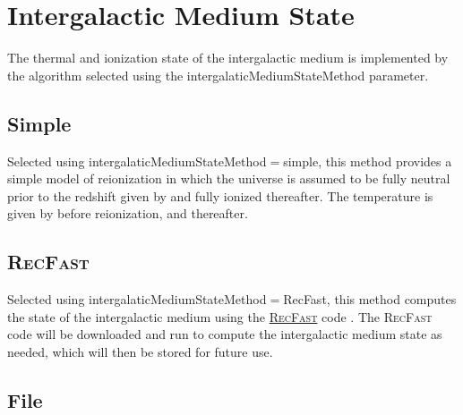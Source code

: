 \section{Intergalactic Medium State}\label{sec:IntergalacticMediumStateMethod}

The thermal and ionization state of the intergalactic medium is implemented by the algorithm selected using the {\normalfont \ttfamily intergalaticMediumStateMethod} parameter.

\subsection{Simple}\label{phys:intergalacticMediumState:intergalacticMediumStateSimple}

Selected using {\normalfont \ttfamily intergalaticMediumStateMethod}$=${\normalfont \ttfamily simple}, this method provides a simple model of reionization in which the universe is assumed to be fully neutral prior to the redshift given by {\normalfont \ttfamily [igmStateSimpleReionizationRedshift]} and fully ionized thereafter. The temperature is given by {\normalfont \ttfamily [igmStateSimplePreReionizationTemperature]} before reionization, and {\normalfont \ttfamily [igmStateSimpleReionizationTemperature]} thereafter.

\subsection{{\normalfont \scshape RecFast}}\label{phys:intergalacticMediumState:intergalacticMediumStateRecFast}

Selected using {\normalfont \ttfamily intergalaticMediumStateMethod}$=${\normalfont \ttfamily RecFast}, this method computes the state of the intergalactic medium using the \href{http://www.astro.ubc.ca/people/scott/recfast.html}{{\normalfont \scshape RecFast}} code \cite{seager_how_2000,wong_how_2008}. The {\normalfont \scshape RecFast} code will be downloaded and run to compute the intergalactic medium state as needed, which will then be stored for future use.

\subsection{File}\label{phys:intergalacticMediumState:intergalacticMediumStateFile}

